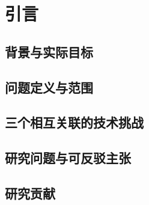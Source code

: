 \chapter{引言}
\label{ch:introduction}

\section{背景与实际目标}
\label{sec:1-1}

\section{问题定义与范围}
\label{sec:1-2}

\section{三个相互关联的技术挑战}
\label{sec:1-3}

\section{研究问题与可反驳主张}
\label{sec:1-4}

\section{研究贡献}
\label{sec:1-5}


